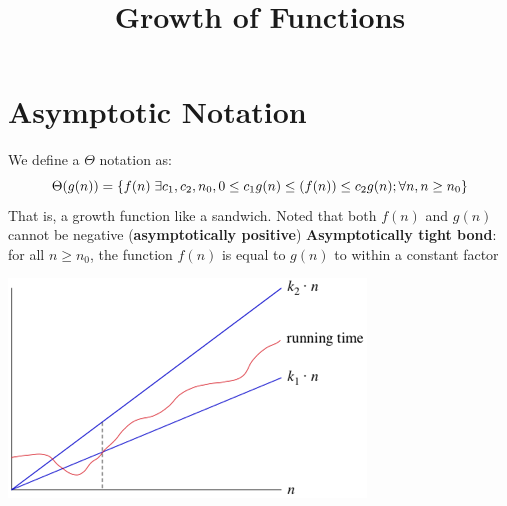 \documentclass{article}
\title{Growth of Functions}
\begin{document}
\maketitle

\section{Asymptotic Notation}
\begin{adjustwidth}{2.5em}{0pt}
We define a $\Theta$ notation as:
 \begin{equation*}
     \Theta(g(n)) = \{f(n) \hspace{0.1cm}\exists c_1, c_2, n_0,0\leq c_1g(n)\leq(f(n))\leq c_2g(n); \forall n, n\geq  n_0\}
 \end{equation*}
That is, a growth function like a sandwich. Noted that both $f(n)$ and $g(n)$ cannot be negative (\textbf{asymptotically positive})\newline
\textbf{Asymptotically tight bond}: for all $n\geq n_0$, the function $f(n)$ is equal to $g(n)$ to within a constant factor
\begin{center}
        \includegraphics[]{atb.png} 
\end{center}



\end{adjustwidth}
 
\end{document}
